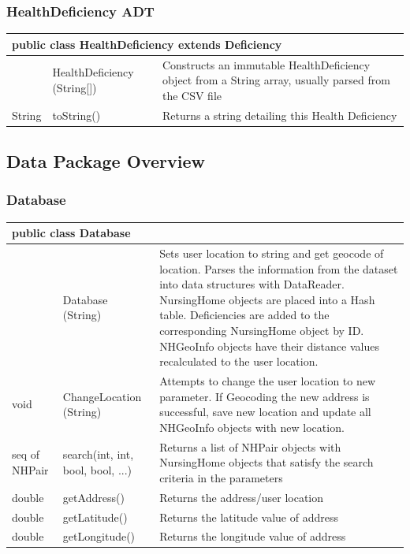 \documentclass[12pt]{article}
\begin{document}
\bigskip

\subsubsection{HealthDeficiency ADT}
\begin{center}
\begin{tabular}{p{0.1\hsize}|p{0.25\hsize}|p{0.50\hsize}}
\multicolumn{3}{l}{\textbf{public class HealthDeficiency extends Deficiency}} \\
\hline
 & HealthDeficiency (String[]) & Constructs an immutable HealthDeficiency object from a String array, usually parsed from the CSV file\\
\hline
String	& toString() & Returns a string detailing this Health Deficiency\\
\hline
\end{tabular}
\end{center}

\newpage
\subsection{Data Package Overview}
\subsubsection{Database}
\begin{center}
\begin{tabular}{p{0.1\hsize}|p{0.25\hsize}|p{0.50\hsize}}
\multicolumn{3}{l}{\textbf{public class Database}} \\
\hline
 & Database (String) & Sets user location to string and get geocode of location. Parses the information from the dataset into data structures with DataReader. NursingHome objects are placed into a Hash table. Deficiencies are added to the corresponding NursingHome object by ID. NHGeoInfo objects have their distance values recalculated to the user location.\\
\hline
void 	& ChangeLocation (String) & Attempts to change the user location to new parameter. If Geocoding the new address is successful, save new location and update all NHGeoInfo objects with new location. \\
\hline
seq of NHPair 	& search(int, int, bool, bool, ...) & Returns a list of NHPair objects with NursingHome objects that satisfy the search criteria in the parameters\\
\hline
double 	& getAddress() & Returns the address/user location\\
\hline
double 	& getLatitude() & Returns the latitude value of address\\
\hline
double 	& getLongitude() & Returns the longitude value of address \\
\hline
\end{tabular}
\end{center}
\end{document}

